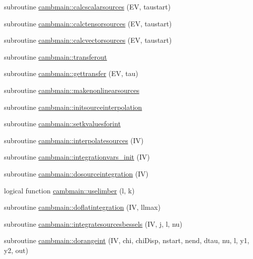 \begin{DoxyCompactItemize}
\item 
subroutine \mbox{\hyperlink{namespacecambmain_ab6fa8682eb65308c413e6501a9b5417c}{cambmain\+::calcscalarsources}} (EV, taustart)
\item 
subroutine \mbox{\hyperlink{namespacecambmain_ad933d804e4a0a4ae8bdf2754e608458d}{cambmain\+::calctensorsources}} (EV, taustart)
\item 
subroutine \mbox{\hyperlink{namespacecambmain_affd6aea4c80363ff01132e154eabbb00}{cambmain\+::calcvectorsources}} (EV, taustart)
\item 
subroutine \mbox{\hyperlink{namespacecambmain_a3411884ad6ba8d1584e9dedab9fdab81}{cambmain\+::transferout}}
\item 
subroutine \mbox{\hyperlink{namespacecambmain_ac9e5e052a53e579f43f980836baee5be}{cambmain\+::gettransfer}} (EV, tau)
\item 
subroutine \mbox{\hyperlink{namespacecambmain_a5b302c437be8bf6d127dc65f638778c8}{cambmain\+::makenonlinearsources}}
\item 
subroutine \mbox{\hyperlink{namespacecambmain_a4af989c7e3c97477fc61f6b31dd053e7}{cambmain\+::initsourceinterpolation}}
\item 
subroutine \mbox{\hyperlink{namespacecambmain_ad0f2dd9e839652502a6e34c32ec44e0d}{cambmain\+::setkvaluesforint}}
\item 
subroutine \mbox{\hyperlink{namespacecambmain_a7e1e9bb292a8b4d778e9b8d218ee4036}{cambmain\+::interpolatesources}} (IV)
\item 
subroutine \mbox{\hyperlink{namespacecambmain_af5b8d9ce147ddcd3fb33ee015b43b284}{cambmain\+::integrationvars\+\_\+init}} (IV)
\item 
subroutine \mbox{\hyperlink{namespacecambmain_a89b9b0f69a8f18b112b2309db4ad29c6}{cambmain\+::dosourceintegration}} (IV)
\item 
logical function \mbox{\hyperlink{namespacecambmain_ad1efd57b702656e463555cccd0f1b40c}{cambmain\+::uselimber}} (l, k)
\item 
subroutine \mbox{\hyperlink{namespacecambmain_a66b6d740c5e702807d5454979eec8cde}{cambmain\+::doflatintegration}} (IV, llmax)
\item 
subroutine \mbox{\hyperlink{namespacecambmain_a74b9c41eb2501d8c0cc163ff7030a926}{cambmain\+::integratesourcesbessels}} (IV, j, l, nu)
\item 
subroutine \mbox{\hyperlink{namespacecambmain_af0980e25384f7d9b2eb64435231f3aa5}{cambmain\+::dorangeint}} (IV, chi, chi\+Disp, nstart, nend, dtau, nu, l, y1, y2, out)
\item 

\end{DoxyCompactItemize}

